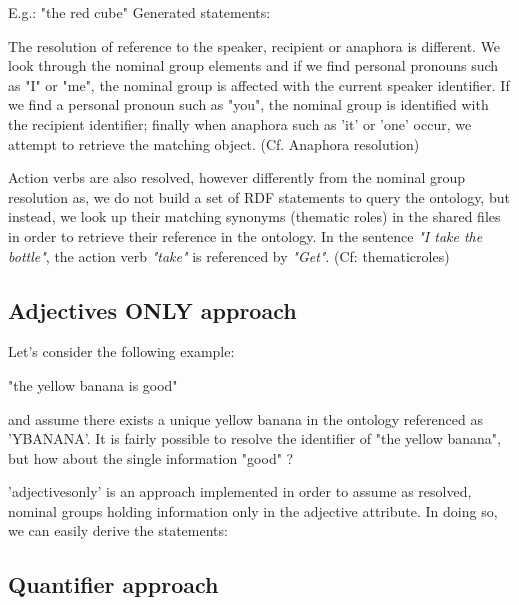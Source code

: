 \documentclass[twoside,a4paper,10pt]{report}
\begin{document}
E.g.:  "the red cube"
  Generated statements:


\small
\begin{verbatimtab}
\end{verbatimtab}
\normalsize

The resolution of reference to the speaker, recipient or anaphora is different. We look through the nominal group elements and if we find personal pronouns such as "I" or "me", the nominal group is affected with the current speaker identifier.
 If we find a personal pronoun such as "you", the nominal group is identified with the recipient identifier; finally when anaphora such as 'it' or 'one' occur, we attempt to retrieve the matching object. (Cf. Anaphora resolution)


Action verbs are also resolved, however differently from the nominal group resolution as, we do not build a set of RDF statements to query the ontology, but instead, we look up their matching synonyms (thematic roles) in the shared files in order to retrieve their reference in the ontology. In the sentence \textsl{"I take the bottle"}, the action verb \textsl{"take"} is referenced by \textsl{"Get"}. (Cf: thematic{\textunderscore}roles)


\subsection{Adjectives ONLY approach}
\label{7ab02d5628e7f210c5eb8e862e7ddc56}%

Let's consider the following example:


\small
\begin{verbatimtab}
  "the yellow banana is good" 
\end{verbatimtab}
\normalsize
and assume there exists a unique yellow banana in the ontology referenced as 'Y{\textunderscore}BANANA'.
It is fairly possible to resolve the identifier of "the yellow banana", but how about the single information "good" ?

'adjectives{\textunderscore}only' is an approach implemented in order to assume as resolved, nominal groups holding information only in the adjective attribute.
In doing so, we can easily derive the statements: 


\small
\begin{verbatimtab}
\end{verbatimtab}
\normalsize

\subsection{Quantifier approach}
\label{3c48ef2a7bfacf5e512a249e797564d3}%
\end{document}
